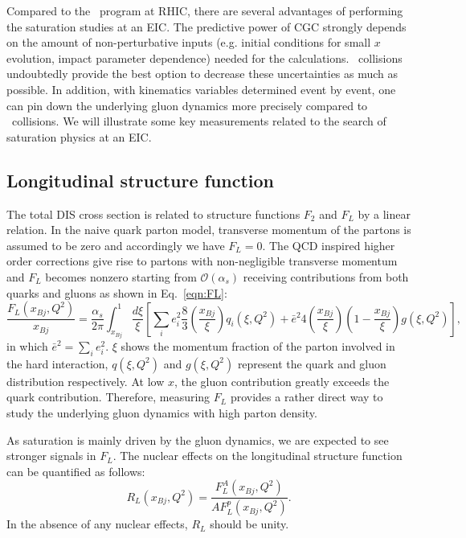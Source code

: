 Compared to the \dA\ program at RHIC, there are several advantages of performing
the saturation studies at an EIC. The predictive power of CGC strongly depends
on the amount of non-perturbative inputs (e.g. initial conditions for small $x$
evolution, impact parameter dependence) needed for the calculations. \eA\
collisions undoubtedly provide the best option to decrease these uncertainties
as much as possible. In addition, with kinematics variables determined event by
event, one can pin down the underlying gluon dynamics more precisely compared to
\dA\ collisions. We will illustrate some key measurements related to the
search of saturation physics at an EIC.

\subsection{Longitudinal structure function}
The total DIS cross section is related to structure functions $F_2$ and $F_L$ by
a linear relation. In the naive quark parton model, transverse momentum of the
partons is assumed to be zero and accordingly we have $F_{L}=0$. The QCD
inspired higher order corrections give rise to partons with non-negligible
transverse momentum and $F_{L}$ becomes nonzero starting from
$\mathcal{O}(\alpha_{s})$ receiving contributions from both quarks and gluons as
shown in Eq.~\ref{eqn:FL}:
\begin{equation}
\frac{F_{L}(x_{Bj},Q^{2})}{x_{Bj}}=\frac{\alpha_{s}}{2\pi}\int^{1}_{x_{Bj}}\frac{d\xi}{\xi}[\sum_{i}e^{2}_{i}\frac{8}{3}(\frac{x_{Bj}}{\xi})q_{i}(\xi,Q^{2})
+{\bar{e}}^{2}4(\frac{x_{Bj}}{\xi})(1-\frac{x_{Bj}}{\xi})g(\xi,Q^{2})], \label{eqn:FL}
\end{equation}
in which $\bar{e}^{2}=\sum_{i}e_{i}^{2}$. $\xi$ shows the momentum fraction of the parton involved in the hard interaction, $q(\xi,Q^{2})$ and
$g(\xi,Q^{2})$ represent the quark and gluon distribution respectively. 
At low $x$, the gluon contribution greatly exceeds the quark contribution. Therefore, measuring $F_{L}$ provides a rather direct
way to study the underlying gluon dynamics with high parton density.

As saturation is mainly driven by the gluon dynamics, we are expected to see
stronger signals in $F_L$. The nuclear effects on the longitudinal structure
function can be quantified as follows:
\begin{equation}
R_{L}(x_{Bj},Q^{2})=\frac{F^{A}_{L}(x_{Bj},Q^{2})}{AF^{p}_{L}(x_{Bj},Q^{2})}.
\end{equation}
In the absence of any nuclear effects, $R_L$ should be unity. 

